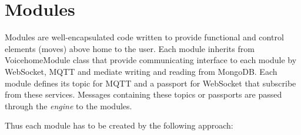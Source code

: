 \chapter{Modules} \label{chap:modules}


Modules are well-encapsulated code written to provide functional and control elements (moves) above home to the user. Each module inherits from VoicehomeModule class that provide communicating interface to each module by WebSocket, MQTT and mediate writing and reading from MongoDB. Each module defines its topic for MQTT and a passport for WebSocket that subscribe from these services. Messages containing these topics or passports are passed through the \textit{engine} to the modules.

Thus each module has to be created by the following approach:

